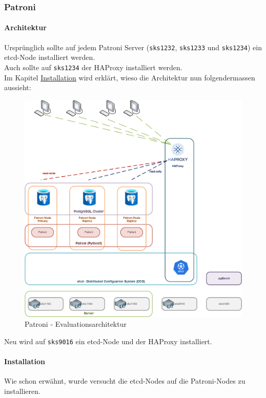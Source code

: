 
\begin{flushleft}
    \subsubsection{Patroni}
    \paragraph{Architektur}
    Ursprünglich sollte auf jedem Patroni Server (\texttt{sks1232}, \texttt{sks1233} und \texttt{sks1234}) ein \gls{etcd}-Node installiert werden.\\
    Auch sollte auf \texttt{sks1234} der \Gls{HAProxy} installiert werden.\\
    Im Kapitel \hyperref[par:patroni_installation]{Installation} wird erklärt, wieso die Architektur nun folgendermassen aussieht:
    \begin{figure}[H]
        \centering
        \includegraphics[width=0.8\linewidth]{source/implementation/evaluation/postgresql_ha_solutions/patroni/patroni-evaluation-architecture}
        \caption{Patroni - Evaluationsarchitektur}
        \label{fig:patroni-evaluation-architecture.png}
    \end{figure}
    Neu wird auf \texttt{sks9016} ein \gls{etcd}-Node und der \Gls{HAProxy} installiert.
\end{flushleft}
\begin{flushleft}
    \paragraph{Installation}
    \label{par:patroni_installation}
    Wie schon erwähnt, wurde versucht die \gls{etcd}-Nodes auf die Patroni-Nodes zu installieren.
\end{flushleft}
